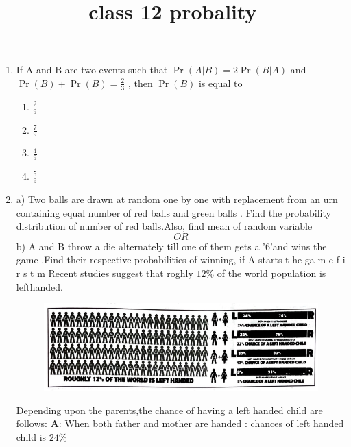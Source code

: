 \documentclass{article}
\begin{document}
\title{class 12 probality}
\maketitle
\LARGE
\begin{enumerate}
\item If $\mathrm{A}$ and $\mathrm{B}$ are two events such that $\Pr(A|B) = 2\Pr(B|A)$ and $\Pr(B) +\Pr(B)=\frac{2}{3}$ , then $\Pr(B)$ is equal to
\begin{multicols}{2}
\begin{enumerate}
\item $\frac{2}{9}$
\item $\frac{7}{9}$
\item $\frac{4}{9}$
\item $\frac{5}{9}$
\end{enumerate}
\end{multicols}
\item a) Two balls are drawn at random one by one with replacement from an urn containing equal number of red balls and green balls . Find the probability distribution of number of red balls.Also, find mean of random variable $$OR$$ b) A and B throw a die alternately till one of them gets a '$6$'and wins the game .Find their respective probabilities of winning, if A starts t he ga m e    f  i r  s  t m Recent studies suggest that roghly  $12\%$ of the world population is lefthanded.
\begin{figure}
\centering
\includegraphics[width=\columnwidth]{left.png}
\end{figure}
Depending upon the parents,the chance of having a left handed child are follows:
\textbf{A}: When both father and mother are handed :
             chances of left handed child is $24\%$

\end{enumerate}
\end{document}
